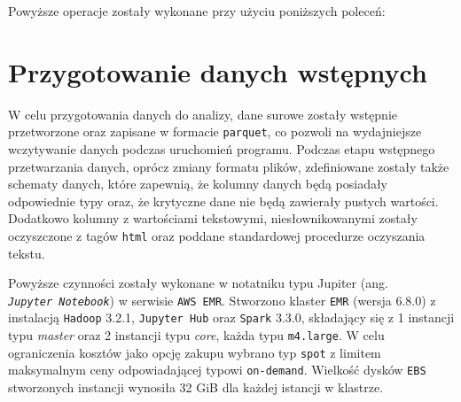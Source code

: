 \documentclass[
  letterpaper,
  DIV=11,
  numbers=noendperiod]{scrreprt}
\newenvironment{Shaded}{\begin{snugshade}}{\end{snugshade}}
\newcommand{\NormalTok}[1]{\textcolor[rgb]{0.00,0.23,0.31}{#1}}
\begin{document}
Powyższe operacje zostały wykonane przy użyciu poniższych poleceń:

\begin{Shaded}
\end{Shaded}

\hypertarget{przygotowanie-danych-wstux119pnych}{%
\section{Przygotowanie danych
wstępnych}\label{przygotowanie-danych-wstux119pnych}}

W celu przygotowania danych do analizy, dane surowe zostały wstępnie
przetworzone oraz zapisane w formacie \texttt{parquet}, co pozwoli na
wydajniejsze wczytywanie danych podczas uruchomień programu. Podczas
etapu wstępnego przetwarzania danych, oprócz zmiany formatu plików,
zdefiniowane zostały także schematy danych, które zapewnią, że kolumny
danych będą posiadały odpowiednie typy oraz, że krytyczne dane nie będą
zawierały pustych wartości. Dodatkowo kolumny z wartościami tekstowymi,
niesłownikowanymi zostały oczyszczone z tagów \texttt{html} oraz poddane
standardowej procedurze oczyszania tekstu.

Powyższe czynności zostały wykonane w notatniku typu Jupiter (ang.
\emph{\texttt{Jupyter\ Notebook}}) w serwisie \texttt{AWS\ EMR}.
Stworzono klaster \texttt{EMR} (wersja 6.8.0) z instalacją
\texttt{Hadoop} 3.2.1, \texttt{Jupyter\ Hub} oraz \texttt{Spark} 3.3.0,
składający się z 1 instancji typu \emph{master} oraz 2 instancji typu
\emph{core}, każda typu \texttt{m4.large}. W celu ograniczenia kosztów
jako opcję zakupu wybrano typ \texttt{spot} z limitem maksymalnym ceny
odpowiadającej typowi \texttt{on-demand}. Wielkość dysków \texttt{EBS}
stworzonych instancji wynosiła 32 GiB dla każdej istancji w klastrze.
\end{document}
